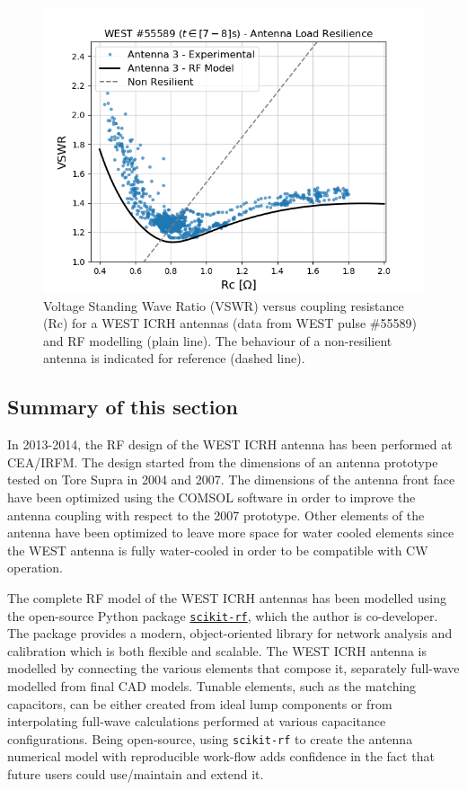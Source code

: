 {\begin{figure}[h]
	\centering
	\includegraphics[width=1.0\linewidth]{figures/chap3/WEST_ICRH/WEST_ICRH_VSWR_vs_Rc}
	\caption{Voltage Standing Wave Ratio (VSWR) versus coupling resistance (Rc) for a WEST ICRH antennas (data from WEST pulse \#55589) and RF modelling (plain line). The behaviour of a non-resilient antenna is indicated for reference (dashed line).}
	\label{fig:westicrhvswrvsrc}
\end{figure}


\subsection{Summary of this section}
In 2013-2014, the RF design of the WEST ICRH antenna has been performed at CEA/IRFM. The design started from the dimensions of an antenna prototype tested on Tore Supra in 2004 and 2007. The dimensions of the antenna front face have been optimized using the COMSOL software in order to improve the antenna coupling with respect to the 2007 prototype. Other elements of the antenna have been optimized to leave more space for water cooled elements since the WEST antenna is fully water-cooled in order to be compatible with CW operation. 

The complete RF model of the WEST ICRH antennas has been modelled using the open-source Python package \href{http://scikit-rf.org/}{\texttt{scikit-rf}}, which the author is co-developer. The package provides a modern, object-oriented library for network analysis and calibration which is both flexible and scalable. The WEST ICRH antenna is modelled by connecting the various elements that compose it, separately full-wave modelled from final CAD models. Tunable elements, such as the matching capacitors, can be either created from ideal lump components or from interpolating full-wave calculations performed at various capacitance configurations. Being open-source, using \texttt{scikit-rf} to create the antenna numerical model with reproducible work-flow adds confidence in the fact that future users could use/maintain and extend it.

}
